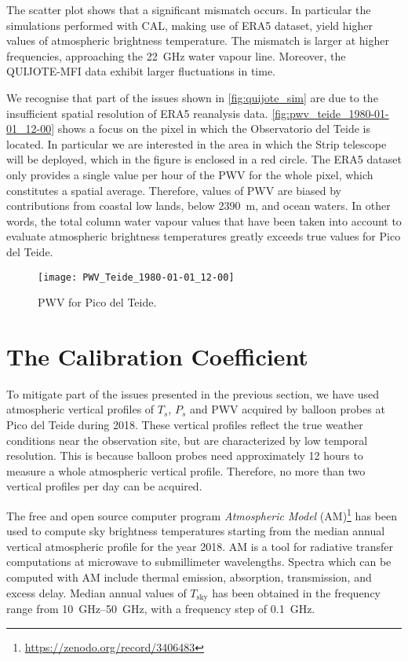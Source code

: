 The scatter plot shows that a significant mismatch occurs. In particular
the simulations performed with CAL, making use of ERA5 dataset, yield
higher values of atmospheric brightness temperature. The mismatch is larger
at higher frequencies, approaching the \SI{22}{\giga\hertz} water vapour
line. Moreover, the QUIJOTE-MFI data exhibit larger fluctuations in time.

We recognise that part of the issues shown in \autoref{fig:quijote_sim}
are due to the insufficient spatial resolution of ERA5 reanalysis data.
\autoref{fig:pwv_teide_1980-01-01_12-00} shows a focus on the pixel in
which the Observatorio del Teide is located. In particular we are
interested in the area in which the Strip telescope will be deployed, which
in the figure is enclosed in a red circle. The ERA5 dataset only provides a
single value per hour of the PWV for the whole pixel, which constitutes a
spatial average.  Therefore, values of PWV are biased by contributions from
coastal low lands, below \SI{2390}{\meter}, and ocean waters. In other
words, the total column water vapour values that have been taken into
account to evaluate atmospheric brightness temperatures greatly exceeds
true values for Pico del Teide.

\begin{figure}
        \centering
        \texttt{[image: PWV\_Teide\_1980-01-01\_12-00]}
        \caption{PWV for Pico del Teide.}
        \label{fig:pwv_teide_1980-01-01_12-00}
\end{figure}

\section{The Calibration Coefficient}

To mitigate part of the issues presented in the previous section, we have
used atmospheric vertical profiles of $T_s$, $P_s$ and PWV acquired by
balloon probes at Pico del Teide during 2018. These vertical
profiles reflect the true weather conditions near the observation site,
but are characterized by low temporal resolution. This is because balloon
probes need approximately \num{12} hours to measure a whole atmospheric
vertical profile. Therefore, no more than two vertical profiles per day can
be acquired.


The free and open source computer program \emph{Atmospheric Model}
(AM)\footnote{\url{https://zenodo.org/record/3406483}}
\autocite{paine2012atmospheric} has been used to compute sky brightness
temperatures starting from the  median annual vertical atmospheric profile
for the year 2018. AM is a tool for radiative transfer computations at
microwave to submillimeter wavelengths.  Spectra which can be computed with
AM include thermal emission, absorption, transmission, and excess delay.
Median annual values of $T_\text{sky}$ has been obtained in the frequency
range from \SIrange{10}{50}{\giga\hertz}, with a frequency step of
\SI{0.1}{\giga\hertz}.

